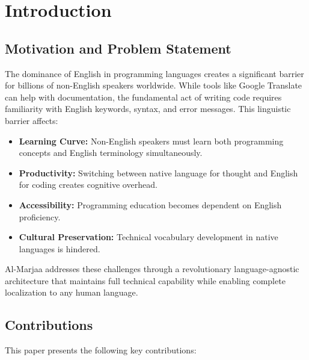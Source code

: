 \documentclass[11pt,a4paper]{article}
\begin{document}
\newpage

\tableofcontents
\newpage

\section{Introduction}

\subsection{Motivation and Problem Statement}

The dominance of English in programming languages creates a significant barrier for billions of non-English speakers worldwide. While tools like Google Translate can help with documentation, the fundamental act of writing code requires familiarity with English keywords, syntax, and error messages. This linguistic barrier affects:

\begin{itemize}
    \item \textbf{Learning Curve:} Non-English speakers must learn both programming concepts and English terminology simultaneously.
    \item \textbf{Productivity:} Switching between native language for thought and English for coding creates cognitive overhead.
    \item \textbf{Accessibility:} Programming education becomes dependent on English proficiency.
    \item \textbf{Cultural Preservation:} Technical vocabulary development in native languages is hindered.
\end{itemize}

Al-Marjaa addresses these challenges through a revolutionary language-agnostic architecture that maintains full technical capability while enabling complete localization to any human language.

\subsection{Contributions}

This paper presents the following key contributions:
\end{document}
